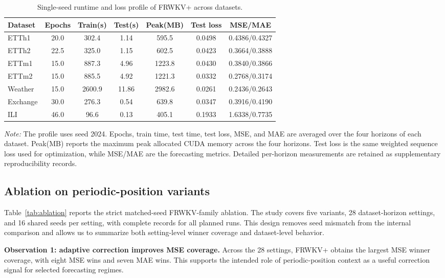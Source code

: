 \documentclass[a4paper,fleqn]{cas-sc}
\begin{document}
\begin{table}[t]
\centering
\caption{Single-seed runtime and loss profile of FRWKV+ across datasets.}
\label{tab:runtime_profile}
\scriptsize
\setlength{\tabcolsep}{3pt}
\begin{tabular}{lcccccc}
\toprule
Dataset & Epochs & Train(s) & Test(s) & Peak(MB) & Test loss & MSE/MAE \\
\midrule
ETTh1 & 20.0 & 302.4 & 1.14 & 595.5 & 0.0498 & 0.4386/0.4327 \\
ETTh2 & 22.5 & 325.0 & 1.15 & 602.5 & 0.0423 & 0.3664/0.3888 \\
ETTm1 & 15.0 & 887.3 & 4.96 & 1223.8 & 0.0430 & 0.3840/0.3866 \\
ETTm2 & 15.0 & 885.5 & 4.92 & 1221.3 & 0.0332 & 0.2768/0.3174 \\
Weather & 15.0 & 2600.9 & 11.86 & 2982.6 & 0.0261 & 0.2436/0.2643 \\
Exchange & 30.0 & 276.3 & 0.54 & 639.8 & 0.0347 & 0.3916/0.4190 \\
ILI & 46.0 & 96.6 & 0.13 & 405.1 & 0.1933 & 1.6338/0.7735 \\
\bottomrule
\end{tabular}
\par\smallskip
\begin{minipage}{\textwidth}
\footnotesize \emph{Note:} The profile uses seed 2024. Epochs, train time, test time, test loss, MSE, and MAE are averaged over the four horizons of each dataset. Peak(MB) reports the maximum peak allocated CUDA memory across the four horizons. Test loss is the same weighted sequence loss used for optimization, while MSE/MAE are the forecasting metrics. Detailed per-horizon measurements are retained as supplementary reproducibility records.
\end{minipage}
\end{table}

\subsection{Ablation on periodic-position variants}
Table~\ref{tab:ablation} reports the strict matched-seed FRWKV-family ablation. The study covers five variants, 28 dataset-horizon settings, and 16 shared seeds per setting, with complete records for all planned runs. This design removes seed mismatch from the internal comparison and allows us to summarize both setting-level winner coverage and dataset-level behavior.

\textbf{Observation 1: adaptive correction improves MSE coverage.}
Across the 28 settings, FRWKV+ obtains the largest MSE winner coverage, with eight MSE wins and seven MAE wins. This supports the intended role of periodic-position context as a useful correction signal for selected forecasting regimes.
\end{document}
